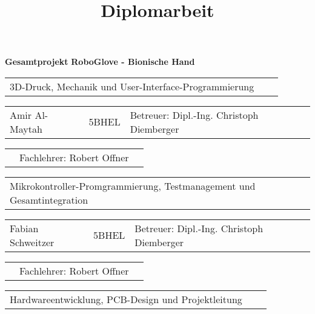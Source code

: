 \documentclass[11pt]{article}
\begin{document}
\title{\textbf{\Huge{Diplomarbeit}}}
\maketitle

\begin{center}

	\hfill \break
	\hfill \break
	\hfill \break
	\textbf{\Large{Gesamtprojekt}} \break
	\textbf{\LARGE{RoboGlove - Bionische Hand}}

	\hfill \break
	\hfill \break
	\hfill \break
	\hfill \break
	\hfill \break
	\hfill \break

	\begin{tabular}{p{10cm}p{1cm}l}
		3D-Druck, Mechanik und User-Interface-Programmierung \\
	\end{tabular}

	\begin{tabular}{p{3cm}p{2cm}l}
		Amir Al-Maytah & 5BHEL & Betreuer: Dipl.-Ing. Christoph Diemberger \\
	\end{tabular}

	\begin{tabular}{p{3.26cm}p{5cm}l}
		& Fachlehrer: Robert Offner 
	\end{tabular}

	\hfill \break

	\begin{tabular}{p{14cm}p{1cm}l}
		Mikrokontroller-Promgrammierung, Testmanagement und Gesamtintegration \\
	\end{tabular}

	\begin{tabular}{p{3cm}p{2cm}l}
		Fabian Schweitzer & 5BHEL & Betreuer: Dipl.-Ing. Christoph Diemberger \\
	\end{tabular}

	\begin{tabular}{p{3.26cm}p{5cm}l}
		& Fachlehrer: Robert Offner 
	\end{tabular}

	\hfill \break

	\begin{tabular}{p{10cm}p{1cm}l}
		Hardwareentwicklung, PCB-Design und Projektleitung \\
	\end{tabular}


\end{center}
\end{document}
